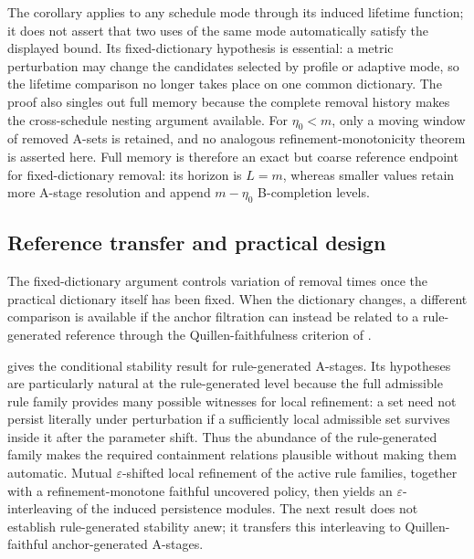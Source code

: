\documentclass[a4paper,11pt]{article}
\theoremstyle{definition}
\theoremstyle{remark}
\begin{document}
The corollary applies to any schedule mode through its induced lifetime function; it does not assert that two uses of the same mode automatically satisfy the displayed bound. Its fixed-dictionary hypothesis is essential: a metric perturbation may change the candidates selected by profile or adaptive mode, so the lifetime comparison no longer takes place on one common dictionary. The proof also singles out full memory because the complete removal history makes the cross-schedule nesting argument available. For $\eta_0<m$, only a moving window of removed A-sets is retained, and no analogous refinement-monotonicity theorem is asserted here. Full memory is therefore an exact but coarse reference endpoint for fixed-dictionary removal: its horizon is $L=m$, whereas smaller values retain more A-stage resolution and append $m-\eta_0$ B-completion levels.

\subsection{Reference transfer and practical design}
\label{subsec:quillen-stability-transfer}

The fixed-dictionary argument controls variation of removal times once the practical dictionary itself has been fixed. When the dictionary changes, a different comparison is available if the anchor filtration can instead be related to a rule-generated reference through the Quillen-faithfulness criterion of .

 gives the conditional stability result for rule-generated A-stages. Its hypotheses are particularly natural at the rule-generated level because the full admissible rule family provides many possible witnesses for local refinement: a set need not persist literally under perturbation if a sufficiently local admissible set survives inside it after the parameter shift. Thus the abundance of the rule-generated family makes the required containment relations plausible without making them automatic. Mutual $\varepsilon$-shifted local refinement of the active rule families, together with a refinement-monotone faithful uncovered policy, then yields an $\varepsilon$-interleaving of the induced persistence modules. The next result does not establish rule-generated stability anew; it transfers this interleaving to Quillen-faithful anchor-generated A-stages.
\end{document}
